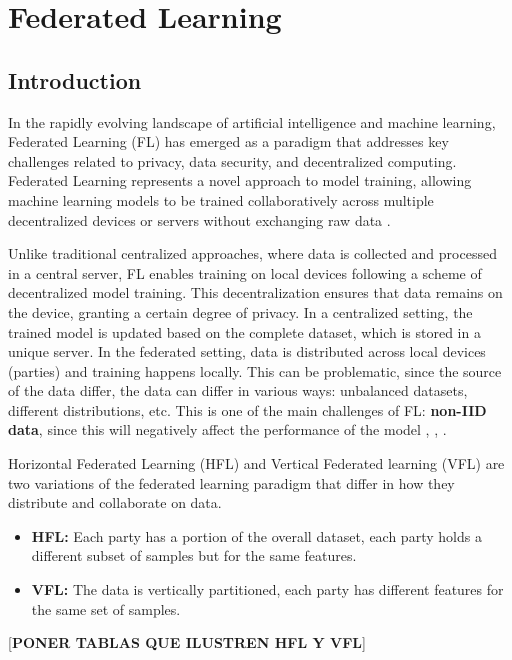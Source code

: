 \chapter{Federated Learning}
\label{ch:Federated_Learning}

\section{Introduction}
In the rapidly evolving landscape of artificial intelligence and machine learning, Federated Learning (FL)
has emerged as a paradigm that addresses key challenges related to privacy, data security,
 and decentralized computing. Federated Learning represents a novel approach to model training, allowing
 machine learning models to be trained collaboratively across multiple decentralized devices or servers
 without exchanging raw data \cite{mcmahan2023a}.

 Unlike traditional centralized approaches, where data is collected and processed in a central server, FL enables training on local devices following a scheme of decentralized model training.
 This decentralization ensures that data remains on the device, granting a certain degree of privacy.
 In a centralized setting, the trained model is updated based on the complete dataset, which is stored in a unique server. In the federated setting, data is distributed across local devices (parties) and training happens locally. This can be problematic, since the source
 of the data differ, the data can differ in various ways: unbalanced datasets, different distributions, etc. This is one of the main challenges of FL:
 \textbf{non-IID data}, since this will negatively affect the performance of the model \cite{li2020}, \cite{zhao2018}, \cite{li2021}.

Horizontal Federated Learning (HFL) and Vertical Federated learning (VFL) are two variations of the federated learning paradigm that differ in how they distribute and collaborate on data.

\begin{itemize}
    \item \textbf{HFL:} Each party has a portion of the overall dataset, each party holds a different subset of samples but for the same features.
    \item \textbf{VFL:} The data  is vertically partitioned, each party has different features for the same set of samples.
\end{itemize}

[\textbf{PONER TABLAS QUE ILUSTREN HFL Y VFL}]

